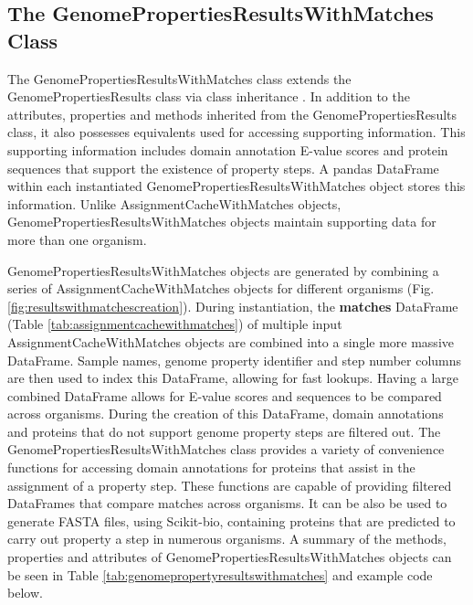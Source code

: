 \subsection{The GenomePropertiesResultsWithMatches Class} \label{PropertyResultsWithMatches}

The GenomePropertiesResultsWithMatches class extends the GenomePropertiesResults class via class inheritance \cite{snyder1986encapsulation}. In addition to the attributes, properties and methods inherited from the GenomePropertiesResults class, it also possesses equivalents used for accessing supporting information. This supporting information includes domain annotation E-value scores and protein sequences that support the existence of property steps. A pandas DataFrame within each instantiated GenomePropertiesResultsWithMatches object stores this information. Unlike AssignmentCacheWithMatches objects,  GenomePropertiesResultsWithMatches objects maintain supporting data for more than one organism.

GenomePropertiesResultsWithMatches objects are generated by combining a series of AssignmentCacheWithMatches objects for different organisms (Fig. \ref{fig:resultswithmatchescreation}). During instantiation, the \textbf{matches} DataFrame (Table \ref{tab:assignmentcachewithmatches}) of multiple input AssignmentCacheWithMatches objects are combined into a single more massive DataFrame. Sample names, genome property identifier and step number columns are then used to index this DataFrame, allowing for fast lookups. Having a large combined DataFrame allows for E-value scores and sequences to be compared across organisms. During the creation of this DataFrame, domain annotations and proteins that do not support genome property steps are filtered out. The GenomePropertiesResultsWithMatches class provides a variety of convenience functions for accessing domain annotations for proteins that assist in the assignment of a property step. These functions are capable of providing filtered DataFrames that compare matches across organisms. It can be also be used to generate FASTA files, using Scikit-bio, containing proteins that are predicted to carry out property a step in numerous organisms. A summary of the methods, properties and attributes of GenomePropertiesResultsWithMatches objects can be seen in Table \ref{tab:genomepropertyresultswithmatches} and example code below. 

